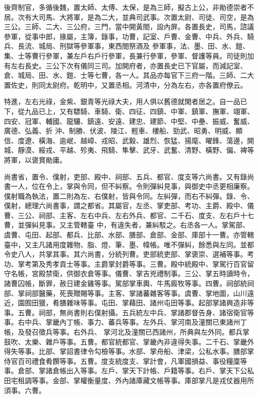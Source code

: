 
\begin{pinyinscope}

 後齊制官，多循後魏，置太師、太傅、太保，是為三師，擬古上公，非勛德崇者不居。次有大司馬、大將軍，是為二大，並典司武事。次置太尉、司徒、司空，是為三公。三師、二大、三公府，三門，當中開黃閤，設內屏。各置長史，司馬，諮議參軍，從事中郎，掾屬，主簿，錄事，功曹，記室、戶曹、金曹、中兵、外兵、騎兵、長流、城局、刑獄等參軍事，東西閤祭酒及
 參軍事，法、墨、田、水、鎧、集、士等曹行參軍，兼左戶右戶行參軍，長兼行參軍，參軍、督護等員。司徒則加有左右長史。三公下次有儀同三司。加開府者，亦置長史已下官屬，而減記室、倉、城局、田、水、鎧、士等七曹，各一人。其品亦每官下三府一階。三師、二大置佐史，則同太尉府。乾明中，又置丞相。河清中，分為左右，亦各置府僚云。



 特進，左右光祿，金紫、銀青等光祿大夫，用人俱以舊德就閑者居之。自一品已下，從九品已上，又有驃騎、車騎、衛、四征、四鎮、中軍、鎮軍、撫軍、翊軍、四安、冠軍、輔國、龍驤、鎮遠、安遠、建忠、建節、中堅、中壘、振威、奮威、廣德、弘義、折
 沖、制勝、伏波、陵江、輕車、樓船、勁武、昭勇、明威、顯信、度遼、橫海、逾岷、越嶂、戎昭、武毅、雄烈、恢猛、揚麾、曜鋒、蕩邊，開城、靜漠、綏戎、平越、殄夷、飛騎、隼擊、武牙、武奮、清野、橫野、偏、裨等將軍，以褒賞勛庸。



 尚書省，置令、僕射，吏部、殿中、祠部、五兵、都官、度支等六尚書。又有錄尚書一人，位在令上，掌與令同，但不糾察。令則彈糾見事，與御史中丞更相廉察。僕射職為執法，置二則為左、右僕射，皆與令同。左糾彈，而右不糾彈。錄、令、僕射，總理六尚書事，謂之都省。其屬官，左丞、掌吏部、考功、主爵、殿中、儀曹、三公、祠部、主客、左右中兵、左右外兵、都官、二千石、度支、左右戶十七曹，並彈糾見事。又主管轄臺
 中，有違失者，兼糾駁之。右丞各一人。掌駕部、虞曹、屯田、起部、都兵、比部、水部、膳部、倉部、金部、庫部十一曹。亦管轄臺中，又主凡諸用度雜物、脂、燈、筆、墨、幃帳。唯不彈糾，餘悉與左同。並都令史八人，共掌其事。其六尚書，分統列曹。吏部統吏部、掌褒崇、選補等事。考功、掌考第及秀孝貢士等事。主爵掌封爵等事。三曹。殿中統殿中、掌駕行百官留守名帳，宮殿禁衛，供御衣倉等事。儀曹、掌吉兇禮制事。三公、掌五時讀時令，諸曹囚帳，斷罪，赦日建金雞等事。駕部掌車輿、牛馬廄牧等事。四曹。祠部統祠部、掌祠部醫藥，死喪贈賜等事。主客、掌諸蕃雜客等事。虞曹、掌地圖，山川遠近，園囿田獵，肴膳雜味等事。屯田、掌藉田、諸州屯田等事。起部掌諸興造非等事。五曹。祠部，無尚書則右僕射攝。五兵統左中兵、掌諸郡督告身、諸宿衛官等事。右中兵、掌畿內丁帳、事力、蕃兵等事。左外兵、掌河南及潼關已東諸州丁帳，及發召徵兵等事。右外兵、
 掌河北及潼關已西諸州，所典與左外同。都兵掌鼓吹、太樂、雜戶等事。五曹。都官統都官、掌畿內非違得失事。二千石、掌畿外得失等事。比部、掌詔書律令勾檢等事。水部、掌舟船、津梁，公私水事。膳部掌侍官百司禮食肴饌等事。五曹。度支統度支、掌計會，凡軍國損益、事役糧廩等事。倉部、掌諸倉帳出入等事。左戶、掌天下計帳、戶籍等事。右戶、掌天下公私田宅租調等事。金部、掌權衡量度、外內諸庫藏文帳等事。庫部掌凡是戎仗器用所須事。六曹。




\end{pinyinscope}
